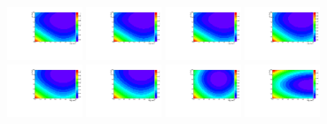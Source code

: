 \begin{figure}[thb]
  \centering
\includegraphics[width=0.2\textwidth]{figures/sec-background/correlation/res_th2F_obs_th2f_res_alpha_00_n005.pdf}
\includegraphics[width=0.2\textwidth]{figures/sec-background/correlation/res_th2F_obs_th2f_res_alpha_01_n005.pdf}
\includegraphics[width=0.2\textwidth]{figures/sec-background/correlation/res_th2F_obs_th2f_res_alpha_02_n005.pdf}
\includegraphics[width=0.2\textwidth]{figures/sec-background/correlation/res_th2F_obs_th2f_res_alpha_03_n005.pdf}
\includegraphics[width=0.2\textwidth]{figures/sec-background/correlation/res_th2F_obs_th2f_res_alpha_04_n005.pdf}
\includegraphics[width=0.2\textwidth]{figures/sec-background/correlation/res_th2F_obs_th2f_res_alpha_05_n005.pdf}
\includegraphics[width=0.2\textwidth]{figures/sec-background/correlation/res_th2F_obs_th2f_res_alpha_06_n005.pdf}
\includegraphics[width=0.2\textwidth]{figures/sec-background/correlation/res_th2F_obs_th2f_res_alpha_07_n005.pdf}

\end{figure}
